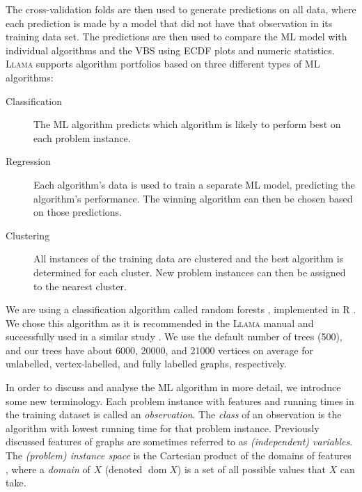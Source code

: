 \documentclass{l4proj}
\theoremstyle{definition}
\theoremstyle{remark}
\DeclareMathOperator{\dom}{dom}
\begin{document}
The cross-validation folds are then used to generate predictions on all data,
where each prediction is made by a model that did not have that observation in
its training data set. The predictions are then used to compare the ML model with
individual algorithms and the VBS using ECDF plots and numeric statistics.
\textsc{Llama} \cite{kotthoff_llama_2013, llama} supports algorithm portfolios
based on three different types of ML algorithms:

\begin{description}
  \item[Classification] The ML algorithm predicts which algorithm is likely to
    perform best on each problem instance.
  \item[Regression] Each algorithm's data is used to train a separate ML model,
    predicting the algorithm's performance. The winning algorithm can then be
    chosen based on those predictions.
  \item[Clustering] All instances of the training data are clustered and the
    best algorithm is determined for each cluster. New problem instances can
    then be assigned to the nearest cluster.
\end{description}

We are using a classification algorithm called random forests
\cite{DBLP:journals/ml/Breiman01}, implemented in R \cite{randomforest}. We
chose this algorithm as it is recommended in the \textsc{Llama} manual
\cite{kotthoff_llama_2013} and successfully used in a similar study
\cite{DBLP:conf/lion/KotthoffMS16}. We use the default number of trees (500),
and our trees have about \num{6000}, \num{20000}, and \num{21000} vertices on
average for unlabelled, vertex-labelled, and fully labelled graphs,
respectively.

In order to discuss and analyse the ML algorithm in more detail, we introduce
some new terminology. Each problem instance with features and running times in
the training dataset is called an \emph{observation}. The \emph{class} of an
observation is the algorithm with lowest running time for that problem instance.
Previously discussed features of graphs are sometimes referred to as
\emph{(independent) variables}. The \emph{(problem) instance space} is the
Cartesian product of the domains of features \cite{DBLP:series/smpai/RokachM14},
where a \emph{domain} of $X$ (denoted $\dom X$) is a set of all possible values
that $X$ can take.
\end{document}
